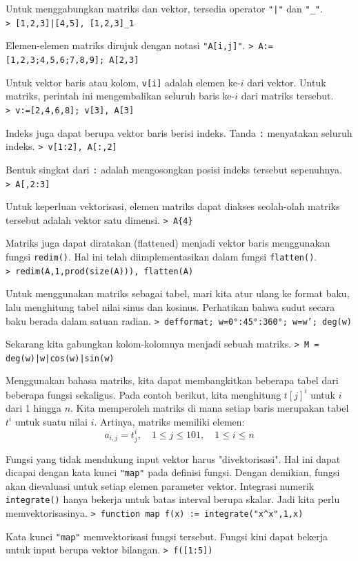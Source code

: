\documentclass[11pt, a4paper]{article}
\newcommand{\emtcmd}[1]{\noindent\texttt{\textcolor{emtcommand}{>}\ #1}\par\smallskip}
\begin{document}
Untuk menggabungkan matriks dan vektor, tersedia operator \texttt{"|"} dan \texttt{"\_"}.
\emtcmd{[1,2,3]|[4,5], [1,2,3]\_1}

Elemen-elemen matriks dirujuk dengan notasi \texttt{"A[i,j]"}.
\emtcmd{A:=[1,2,3;4,5,6;7,8,9]; A[2,3]}

Untuk vektor baris atau kolom, \texttt{v[i]} adalah elemen ke-$i$ dari vektor. Untuk matriks, perintah ini mengembalikan seluruh baris ke-$i$ dari matriks tersebut.
\emtcmd{v:=[2,4,6,8]; v[3], A[3]}

Indeks juga dapat berupa vektor baris berisi indeks. Tanda \texttt{:} menyatakan seluruh indeks.
\emtcmd{v[1:2], A[:,2]}

Bentuk singkat dari \texttt{:} adalah mengosongkan posisi indeks tersebut sepenuhnya.
\emtcmd{A[,2:3]}

Untuk keperluan vektorisasi, elemen matriks dapat diakses seolah-olah matriks tersebut adalah vektor satu dimensi.
\emtcmd{A\{4\}}

Matriks juga dapat diratakan (flattened) menjadi vektor baris menggunakan fungsi \texttt{redim()}. Hal ini telah diimplementasikan dalam fungsi \texttt{flatten()}.
\emtcmd{redim(A,1,prod(size(A))), flatten(A)}

Untuk menggunakan matriks sebagai tabel, mari kita atur ulang ke format baku, lalu menghitung tabel nilai sinus dan kosinus. Perhatikan bahwa sudut secara baku berada dalam satuan radian.
\emtcmd{defformat; w=0°:45°:360°; w=w'; deg(w)}

Sekarang kita gabungkan kolom-kolomnya menjadi sebuah matriks.
\emtcmd{M = deg(w)|w|cos(w)|sin(w)}

Menggunakan bahasa matriks, kita dapat membangkitkan beberapa tabel dari beberapa fungsi sekaligus. Pada contoh berikut, kita menghitung $t[j]^i$ untuk $i$ dari 1 hingga $n$. Kita memperoleh matriks di mana setiap baris merupakan tabel $t^i$ untuk suatu nilai $i$. Artinya, matriks memiliki elemen:
$$a_{i,j} = t_j^i, \quad 1 \le j \le 101, \quad 1 \le i \le n$$

Fungsi yang tidak mendukung input vektor harus "divektorisasi". Hal ini dapat dicapai dengan kata kunci \texttt{"map"} pada definisi fungsi. Dengan demikian, fungsi akan dievaluasi untuk setiap elemen parameter vektor. Integrasi numerik \texttt{integrate()} hanya bekerja untuk batas interval berupa skalar. Jadi kita perlu memvektorisasinya.
\emtcmd{function map f(x) := integrate("x\^{}x",1,x)}

Kata kunci \texttt{"map"} memvektorisasi fungsi tersebut. Fungsi kini dapat bekerja untuk input berupa vektor bilangan.
\emtcmd{f([1:5])}
\end{document}
